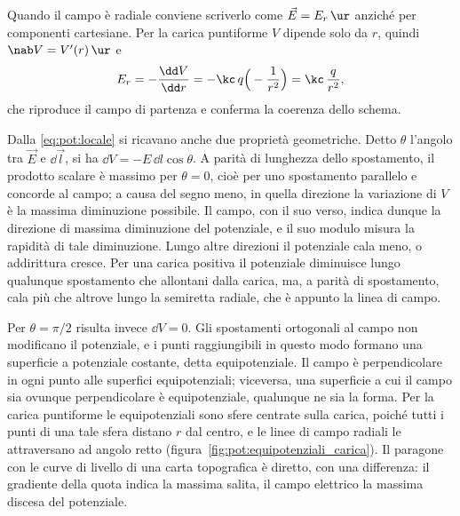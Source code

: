 \documentclass[main.tex]{subfiles}
\begin{document}
	Quando il campo è radiale conviene scriverlo come $\vec E=E_r\,\ur$ anziché per componenti cartesiane. Per la carica puntiforme $V$ dipende solo da $r$, quindi $\nab V=V'(r)\,\ur$ e
	\[
	E_r=-\frac{\dd V}{\dd r}=-\kc\,q\Big(-\frac1{r^2}\Big)=\kc\,\frac{q}{r^2},
	\]
	che riproduce il campo di partenza e conferma la coerenza dello schema.
	
	Dalla \eqref{eq:pot:locale} si ricavano anche due proprietà geometriche. Detto $\theta$ l'angolo tra $\vec E$ e $\dd\vec l$, si ha $\dd V=-E\,\dd l\cos\theta$. A parità di lunghezza dello spostamento, il prodotto scalare è massimo per $\theta=0$, cioè per uno spostamento parallelo e concorde al campo; a causa del segno meno, in quella direzione la variazione di $V$ è la massima diminuzione possibile. Il campo, con il suo verso, indica dunque la direzione di massima diminuzione del potenziale, e il suo modulo misura la rapidità di tale diminuzione. Lungo altre direzioni il potenziale cala meno, o addirittura cresce. Per una carica positiva il potenziale diminuisce lungo qualunque spostamento che allontani dalla carica, ma, a parità di spostamento, cala più che altrove lungo la semiretta radiale, che è appunto la linea di campo.
	
	Per $\theta=\pi/2$ risulta invece $\dd V=0$. Gli spostamenti ortogonali al campo non modificano il potenziale, e i punti raggiungibili in questo modo formano una superficie a potenziale costante, detta equipotenziale. Il campo è perpendicolare in ogni punto alle superfici equipotenziali; viceversa, una superficie a cui il campo sia ovunque perpendicolare è equipotenziale, qualunque ne sia la forma. Per la carica puntiforme le equipotenziali sono sfere centrate sulla carica, poiché tutti i punti di una tale sfera distano $r$ dal centro, e le linee di campo radiali le attraversano ad angolo retto (figura~\ref{fig:pot:equipotenziali_carica}). Il paragone con le curve di livello di una carta topografica è diretto, con una differenza: il gradiente della quota indica la massima salita, il campo elettrico la massima discesa del potenziale.
	
\end{document}
